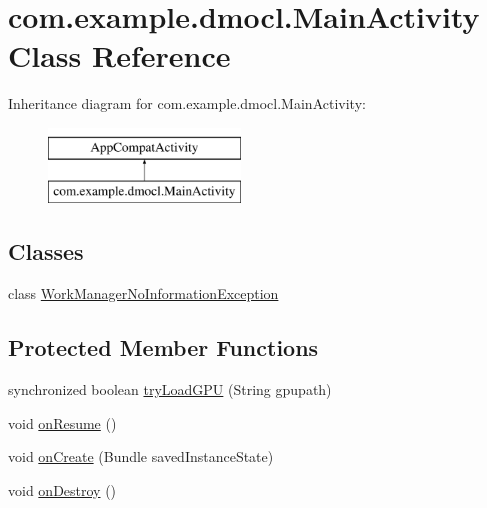 \hypertarget{classcom_1_1example_1_1dmocl_1_1MainActivity}{}\section{com.\+example.\+dmocl.\+Main\+Activity Class Reference}
\label{classcom_1_1example_1_1dmocl_1_1MainActivity}
Inheritance diagram for com.\+example.\+dmocl.\+Main\+Activity\+:\begin{figure}[H]
\begin{center}
\leavevmode
\includegraphics[height=2.000000cm]{classcom_1_1example_1_1dmocl_1_1MainActivity}
\end{center}
\end{figure}
\subsection*{Classes}
\begin{DoxyCompactItemize}
\item 
class \mbox{\hyperlink{classcom_1_1example_1_1dmocl_1_1MainActivity_1_1WorkManagerNoInformationException}{Work\+Manager\+No\+Information\+Exception}}
\end{DoxyCompactItemize}
\subsection*{Protected Member Functions}
\begin{DoxyCompactItemize}
\item 
synchronized boolean \mbox{\hyperlink{classcom_1_1example_1_1dmocl_1_1MainActivity_a26973c08d4b74dcce01e294077211c2f}{try\+Load\+G\+PU}} (String gpupath)
\item 
void \mbox{\hyperlink{classcom_1_1example_1_1dmocl_1_1MainActivity_a59609da2fb62ee158da1d4efc6d26f63}{on\+Resume}} ()
\item 
void \mbox{\hyperlink{classcom_1_1example_1_1dmocl_1_1MainActivity_a10f895ac3f6343c7b6c3b946ceadbf32}{on\+Create}} (Bundle saved\+Instance\+State)
\item 
void \mbox{\hyperlink{classcom_1_1example_1_1dmocl_1_1MainActivity_a0ba841e058a14398a5a6766e0618bd59}{on\+Destroy}} ()
\end{DoxyCompactItemize}
